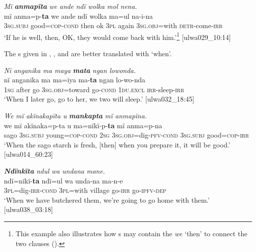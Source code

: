 \ea%
    \label{ex:syntax:243}
          \textit{Mï} \textbf{\textit{anmapïta}} \textit{we ande ndï wolka mol nena.}\\
\gll    mï      anma=p-\textbf{ta}      we    ande  ndï  wolka     ma=ul      na-i-na\\
    3\textsc{sg.subj}  good=\textsc{cop{}-cond} then  ok    \textsc{3pl}  again    3\textsc{sg.obj}=with  \textsc{detr-}come-\textsc{irr}\\
\glt `If he is well, then, OK, they would come back with him.’\footnote{This example also illustrates how s may contain the  \textit{we} ‘then’ to connect the two clauses ().} [ulwa029\_10:14]
\z

  The s given in , , and  are better translated with ‘when’.

\ea%
    \label{ex:syntax:244}
          \textit{Nï anganika ma maya} \textbf{\textit{mata}} \textit{ngan lowonda.}\\
\gll    nï    anganika  ma  ma=iya      ma-\textbf{ta}    ngan lo-wo-nda\\
    1\textsc{sg}  after    go  3\textsc{sg.obj}=toward  go-\textsc{cond}  1\textsc{du.excl}    \textsc{irr-}sleep-\textsc{irr}\\
\glt `When I later go, go to her, we two will sleep.’ [ulwa032\_18:45]
\z

\ea%
    \label{ex:syntax:245}
          \textit{We mï akïnakapïta u} \textbf{\textit{mankapta}} \textit{mï anmapïna.}\\
\gll    we    mï      akïnaka=p-ta    u    ma=nïkï-p-\textbf{ta}     mï      anma=p-na\\
    sago  3\textsc{sg.subj}  young=\textsc{cop}{}-\textsc{cond}  2\textsc{sg}  3\textsc{sg.obj}=dig{}-\textsc{pfv-cond}    3\textsc{sg.subj}  good=\textsc{cop}{}-\textsc{irr}\\
\glt `When the sago starch is fresh, [then] when you prepare it, it will be good.’ [ulwa014\_60:23]
\z

\ea%
    \label{ex:syntax:246}
          \textbf{\textit{Ndïnkïta}} \textit{ndul wa undana mane.}\\
\gll    ndï=nïkï-\textbf{ta}      ndï=ul    wa    unda-na  ma-n-e\\
    3\textsc{pl}=dig{}-\textsc{irr-cond}  3\textsc{pl}=with  village  go-\textsc{irr}    go-\textsc{ipfv-dep}\\
\glt `When we have butchered them, we’re going to go home with them.’ [ulwa038\_03:18]
\z


